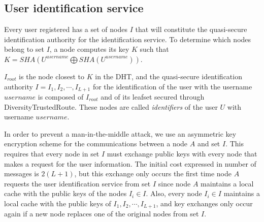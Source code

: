 \subsection{User identification service}
\label{sec:identifiers}

Every user registered has a set of nodes $I$ that
will constitute the quasi-secure identification authority for the
identification service.
To determine which  nodes belong to set $I$, a node computes its key $K$ such that
$K = SHA(U^{username} \bigoplus SHA(U^{username}))$. 

$I_{root}$ is the node closest to $K$ in the DHT, and the quasi-secure identification authority $I =
{I_1, I_2, \cdots, I_{L+1}}$ for the identification of the user with the
username $username$ is composed of $I_{root}$ and of its leafset secured
through DiversityTrustedRoute. These nodes are called \textit{identifiers} of the
user $U$ with username $username$.

 In order to prevent a man-in-the-middle attack, we use an asymmetric key
encryption scheme for the communications between a node $A$ and set $I$. This
requires that every node in set $I$ must exchange public keys with every node that
makes a request for the user information. The initial cost expressed in number
of messages is $2(L+1)$, but this exchange only occurs the first time 
node $A$ requests the user identification service from set $I$ since node $A$
maintains a local cache with the public keys of the nodes $I_i \in I$. Also,
every node $I_i \in I$ maintains a local cache with the public keys of ${I_1,
I_2, \cdots, I_{L+1}}$, and key exchanges only occur again if a new node
replaces one of the original nodes from set $I$.

